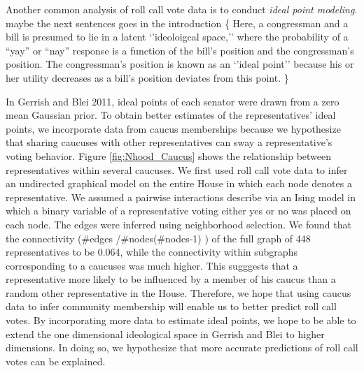 \documentclass{article}
\begin{document}
Another common analysis of roll call vote data is to conduct {\itshape ideal point modeling}. {\color{red} maybe the next sentences goes in the introduction \{} Here, a congressman and a bill is presumed to lie in a latent `'ideoloigcal space,'' where the probability of a ``yay'' or ``nay'' response is a function of the bill's position and the congressman's position. The congressman's position is known as an `'ideal point'' because his or her utility decreases as a bill's position deviates from this point. {\color{red} \}}

In Gerrish and Blei 2011, ideal points of each senator were drawn from a zero mean Gaussian prior. To obtain better estimates of the representatives' ideal points, we incorporate data from caucus memberships because we hypothesize that sharing caucuses with other representatives can sway a representative's voting behavior. Figure \ref{fig:Nhood_Caucus} shows the relationship between representatives within several caucuses. We first used roll call vote data to infer an undirected graphical model on the entire House in which each node denotes a representative. We assumed a pairwise interactions describe via an Ising model in which a binary variable of a representative voting either yes or no was placed on each node. The edges were inferred using neighborhood selection. We found that the connectivity (\#edges /\#nodes(\#nodes-1) ) of the full graph of 448 representatives to be 0.064, while the connectivity within subgraphs corresponding to a caucuses was much higher. This sugggests that a representative more likely to be influenced by a member of his caucus than a random other representative in the House. Therefore, we hope that using caucus data to infer community membership will enable us to better predict roll call votes. By incorporating more data to estimate ideal points, we hope to be able to extend the one dimensional ideological space in Gerrish and Blei to higher dimensions. In doing so, we hypothesize that more accurate predictions of roll call votes can be explained. 



\end{document}
